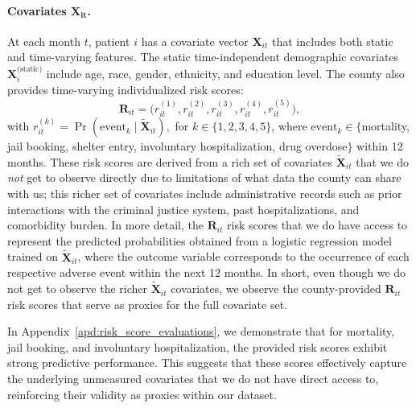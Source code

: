 \paragraph{Covariates $\mathbf{X}_{\bm{it}}$.}  
At each month \(t\), patient \(i\) has a covariate vector \(\mathbf{X}_{it}\) that includes both static and time-varying features. 
The static time-independent demographic covariates \( \mathbf{X}_i^{\text{(static)}} \) include age, race, gender, ethnicity, and education level.
The county also provides time-varying individualized risk scores:
\[
\mathbf{R}_{it} = \big(r_{it}^{(1)}, r_{it}^{(2)}, r_{it}^{(3)}, r_{it}^{(4)}, r_{it}^{(5)}\big),
\]
with
\(
r_{it}^{(k)} = \Pr(\text{event}_k \mid \widetilde{\mathbf{X}}_{it}),
\)
for \(k \in \{1,2,3,4,5\}\),
where \(\text{event}_k \in \{\)mortality, jail booking, shelter entry, involuntary hospitalization, drug overdose\(\}\) within 12 months.
These risk scores are derived from a rich set of covariates \(\mathbf{\widetilde{X}}_{it}\) that we do \emph{not} get to observe directly due to limitations of what data the county can share with us; this richer set of covariates include administrative records such as prior interactions with the criminal justice system, past hospitalizations, and comorbidity burden.
In more detail, the $\mathbf{R}_{it}$ risk scores that we do have access to represent the predicted probabilities obtained from a logistic regression model trained on \(\mathbf{\widetilde{X}}_{it}\), where the outcome variable corresponds to the occurrence of each respective adverse event within the next 12 months. In short, even though we do not get to observe the richer \(\mathbf{\widetilde{X}}_{it}\) covariates, we observe the county-provided $\mathbf{R}_{it}$ risk scores that serve as proxies for the full covariate set.

In Appendix~\ref{apd:risk_score_evaluations}, we demonstrate that for mortality, jail booking, and involuntary hospitalization, the provided risk scores exhibit strong predictive performance. This suggests that these scores effectively capture the underlying unmeasured covariates that we do not have direct access to, reinforcing their validity as proxies within our dataset. 